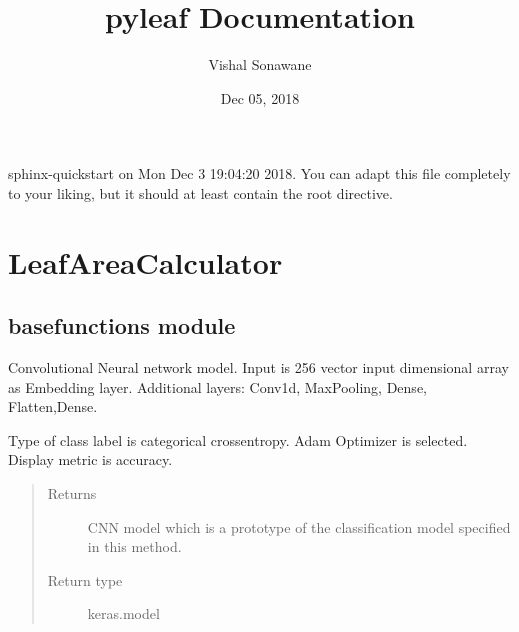\documentclass[letterpaper,10pt,english]{sphinxmanual}
\title{pyleaf Documentation}
\date{Dec 05, 2018}
\author{Vishal Sonawane}
\begin{document}
\pagestyle{empty}
\maketitle
\pagestyle{plain}
\sphinxtableofcontents
\pagestyle{normal}
\label{\detokenize{index::doc}}
sphinx-quickstart on Mon Dec  3 19:04:20 2018.
You can adapt this file completely to your liking, but it should at least
contain the root  directive.




\chapter{LeafAreaCalculator}
\label{\detokenize{modules:leafareacalculator}}\label{\detokenize{modules::doc}}

\section{basefunctions module}
\label{\detokenize{basefunctions:module-basefunctions}}\label{\detokenize{basefunctions:basefunctions-module}}\label{\detokenize{basefunctions::doc}}

\begin{fulllineitems}
\label{\detokenize{basefunctions:basefunctions.CNNModel}}
Convolutional Neural network model.
Input is 256 vector input dimensional array as Embedding layer.
Additional layers: Conv1d, MaxPooling, Dense, Flatten,Dense.

Type of class label is categorical crossentropy. Adam Optimizer is selected. Display metric is accuracy.
\begin{quote}\begin{description}
\item[{Returns}] \leavevmode
CNN model which is a prototype of the classification model specified in this method.

\item[{Return type}] \leavevmode
keras.model

\end{description}\end{quote}

\end{fulllineitems}
\end{document}
